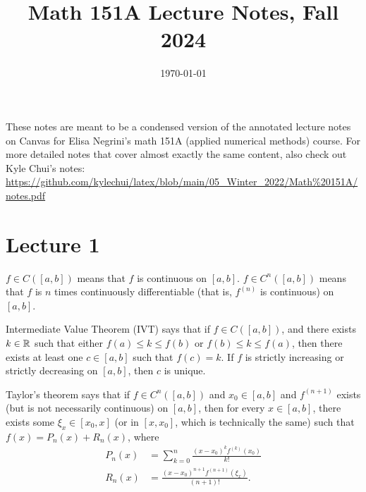 \documentclass{article}
\date{\today}
\title{Math 151A Lecture Notes, Fall 2024}
\begin{document}
\maketitle

These notes are meant to be a condensed version of the annotated lecture notes on Canvas for Elisa Negrini's math 151A (applied numerical methods) course. For more detailed notes that cover almost exactly the same content, also check out Kyle Chui's notes: \url{https://github.com/kylechui/latex/blob/main/05_Winter_2022/Math%20151A/notes.pdf}

\tableofcontents

\section{Lecture 1}
$f \in C([a, b])$ means that $f$ is continuous on $[a,b]$. $f \in C^n([a,b])$ means that $f$ is $n$ times continuously differentiable (that is, $f^{(n)}$ is continuous) on $[a, b]$.
\par
Intermediate Value Theorem (IVT) says that if $f \in C([a,b])$, and there exists $k \in \mathbb{R}$ such that either $f(a) \leq k \leq f(b)$ or $f(b) \leq k \leq f(a)$, then there exists at least one $c \in [a,b]$ such that $f(c)=k$. If $f$ is strictly increasing or strictly decreasing on $[a,b]$, then $c$ is unique.
\par
Taylor's theorem says that if $f \in C^n([a,b])$ and $x_0 \in [a,b]$ and $f^{(n+1)}$ exists (but is not necessarily continuous) on $[a,b]$, then for every $x \in [a,b]$, there exists some $\xi_x \in [x_0, x]$ (or in $[x, x_0]$, which is technically the same) such that $f(x) = P_n(x) + R_n(x)$, where
\begin{align*}
    P_n(x) &= \sum_{k=0}^n \frac{(x-x_0)^k f^{(k)}(x_0)}{k!} \\
    R_n(x) &= \frac{(x-x_0)^{n+1}f^{(n+1)}(\xi_x)}{(n+1)!}.
\end{align*}
\end{document}
